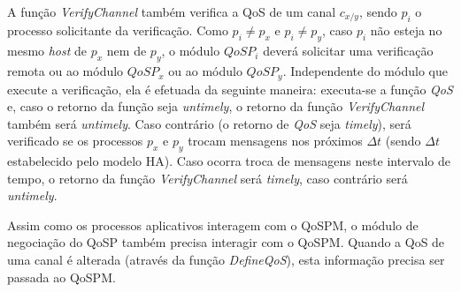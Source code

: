 	A função \textit{VerifyChannel} também verifica a QoS de um canal $c_{x/y}$, sendo $p_{i}$ o processo solicitante da verificação. Como $p_{i} \neq p_{x}$ e $p_{i} \neq p_{y}$, caso $p_{i}$ não  esteja no mesmo \textit{host} de $p_{x}$ nem de $p_{y}$, o módulo $QoSP_{i}$ deverá solicitar uma verificação remota ou ao módulo $QoSP_{x}$ ou ao módulo $QoSP_{y}$. Independente do módulo que execute a verificação, ela é efetuada da seguinte maneira: executa-se a função \textit{QoS} e, caso o retorno da função seja \textit{untimely}, o retorno da função \textit{VerifyChannel} também será \textit{untimely}. Caso contrário (o retorno de \textit{QoS} seja \textit{timely}), será verificado se os processos $p_{x}$ e $p_{y}$ trocam mensagens nos próximos $\Delta{t}$ (sendo $\Delta{t}$ estabelecido pelo modelo HA). Caso ocorra troca de mensagens neste intervalo de tempo, o retorno da função \textit{VerifyChannel} será \textit{timely}, caso contrário será \textit{untimely}.
	
	Assim como os processos aplicativos interagem com o QoSPM, o módulo de negociação do QoSP também precisa interagir com o QoSPM. Quando a QoS de uma canal é alterada (através da função \textit{DefineQoS}), esta informação precisa ser passada ao QoSPM.